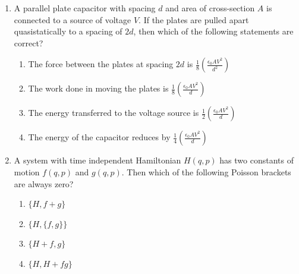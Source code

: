 \documentclass[journal,12pt,onecolumn]{IEEEtran}
\theoremstyle{remark}
\begin{document}
\begin{enumerate}
\item
A parallel plate capacitor with spacing $d$ and area of cross-section $A$ is connected to a source of voltage $V$. If the plates are pulled apart quasistatically to a spacing of $2d$, then which of the following statements are correct?
\begin{enumerate}
    \item The force between the plates at spacing $2d$ is $\frac{1}{8} \left( \frac{\epsilon_0 A V^2}{d^2} \right)$
    \item The work done in moving the plates is $\frac{1}{8} \left( \frac{\epsilon_0 A V^2}{d} \right)$
    \item The energy transferred to the voltage source is $\frac{1}{2} \left( \frac{\epsilon_0 A V^2}{d} \right)$
    \item The energy of the capacitor reduces by $\frac{1}{4} \left( \frac{\epsilon_0 A V^2}{d} \right)$
\end{enumerate}


\item
A system with time independent Hamiltonian $H(q, p)$ has two constants of motion $f(q, p)$ and $g(q, p)$. Then which of the following Poisson brackets are always zero?
\begin{enumerate}
    \item $\{H, f + g\}$
    \item $\{H, \{f, g\}\}$
    \item $\{H + f, g\}$
    \item $\{H, H + fg\}$
\end{enumerate}



\end{enumerate}
\end{document}

